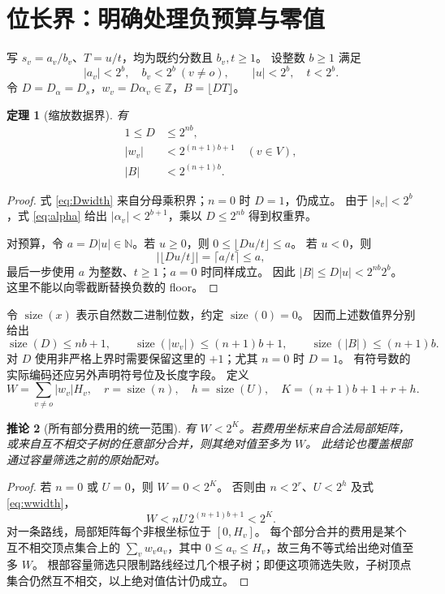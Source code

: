 \documentclass[UTF8,11pt,a4paper]{ctexart}
\newtheorem{theorem}{定理}[section]
\newtheorem{corollary}[theorem]{推论}
\theoremstyle{definition}
\newcommand{\N}{\mathbb N}
\newcommand{\Z}{\mathbb Z}
\newcommand{\bits}{\operatorname{size}}
\newcommand{\abs}[1]{\left|#1\right|}
\begin{document}
\section{位长界：明确处理负预算与零值}
写 $s_v=a_v/b_v$、$T=u/t$，均为既约分数且 $b_v,t\ge1$。
设整数 $b\ge1$ 满足
\[
 \abs{a_v}<2^b,\quad b_v<2^b\ (v\ne o),\qquad
 \abs u<2^b,\quad t<2^b.
\]
令 $D=D_\alpha=D_s$，$w_v=D\alpha_v\in\Z$，$B=\lfloor DT\rfloor$。

\begin{theorem}[缩放数据界]\label{thm:width}
有
\begin{align}
 1\le D&\le2^{nb},\label{eq:Dwidth}\\
 \abs{w_v}&<2^{(n+1)b+1}\quad(v\in V),\label{eq:wwidth}\\
 \abs B&<2^{(n+1)b}.\label{eq:Bwidth}
\end{align}
\end{theorem}
\begin{proof}
式 \eqref{eq:Dwidth} 来自分母乘积界；$n=0$ 时 $D=1$，仍成立。
由于 $\abs{s_v}<2^b$，式 \eqref{eq:alpha} 给出
$\abs{\alpha_v}<2^{b+1}$，乘以 $D\le2^{nb}$ 得到权重界。

对预算，令 $a=D\abs u\in\N$。若 $u\ge0$，则
$0\le\lfloor Du/t\rfloor\le a$。
若 $u<0$，则
\[
 \abs{\lfloor Du/t\rfloor}=\lceil a/t\rceil\le a,
\]
最后一步使用 $a$ 为整数、$t\ge1$；$a=0$ 时同样成立。
因此 $\abs B\le D\abs u<2^{nb}2^b$。
这里不能以向零截断替换负数的 floor。
\end{proof}

令 $\bits(x)$ 表示自然数二进制位数，约定 $\bits(0)=0$。
因而上述数值界分别给出
\[
 \bits(D)\le nb+1,\qquad
 \bits(\abs{w_v})\le(n+1)b+1,\qquad
 \bits(\abs B)\le(n+1)b.
\]
对 $D$ 使用非严格上界时需要保留这里的 $+1$；尤其 $n=0$ 时 $D=1$。
有符号数的实际编码还应另外声明符号位及长度字段。
定义
\[
 W=\sum_{v\ne o}\abs{w_v}H_v,\quad
 r=\bits(n),\quad h=\bits(U),\quad
 K=(n+1)b+1+r+h.
\]
\begin{corollary}[所有部分费用的统一范围]\label{cor:cost}
有 $W<2^K$。若费用坐标来自合法局部矩阵，或来自互不相交子树的任意部分合并，则其绝对值至多为 $W$。
此结论也覆盖根部通过容量筛选之前的原始配对。
\end{corollary}
\begin{proof}
若 $n=0$ 或 $U=0$，则 $W=0<2^K$。
否则由 $n<2^r$、$U<2^h$ 及式 \eqref{eq:wwidth}，
\[
 W<nU\,2^{(n+1)b+1}<2^K.
\]
对一条路线，局部矩阵每个非根坐标位于 $[0,H_v]$。
每个部分合并的费用是某个互不相交顶点集合上的
$\sum_v w_v a_v$，其中 $0\le a_v\le H_v$，故三角不等式给出绝对值至多 $W$。
根部容量筛选只限制路线经过几个根子树；即便这项筛选失败，子树顶点集合仍然互不相交，以上绝对值估计仍成立。
\end{proof}
\end{document}

